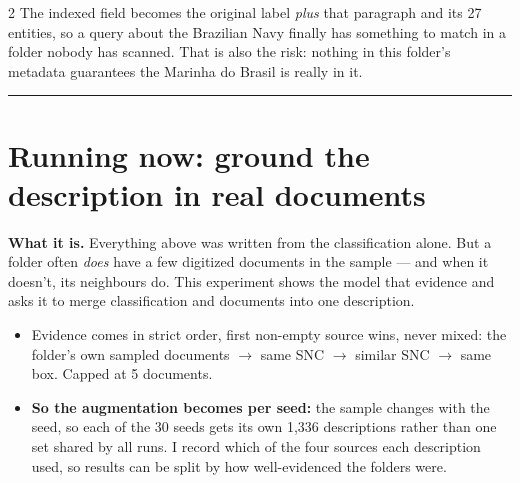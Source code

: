 \documentclass[a4paper,11pt]{article}
\newcommand{\partrule}{\vspace{2pt}\hrule\vspace{6pt}}
\begin{document}
\begin{multicols}{2}
The indexed field becomes the original label \emph{plus} that paragraph and its 27 entities, so
a query about the Brazilian Navy
finally has something to match in a folder nobody has scanned. That is also the risk: nothing
in this folder's metadata guarantees the Marinha do Brasil is really in it.

\partrule

\section{Running now: ground the description in real documents}

\textbf{What it is.} Everything above was written from the classification alone. But a folder
often \emph{does} have a few digitized documents in the sample --- and when it doesn't, its
neighbours do. This experiment shows the model that evidence and asks it to merge
classification and documents into one description.

\begin{itemize}
\item Evidence comes in strict order, first non-empty source wins, never mixed: the folder's
      own sampled documents $\rightarrow$ same SNC $\rightarrow$ similar SNC $\rightarrow$ same
      box. Capped at 5 documents.
\item \textbf{So the augmentation becomes per seed:} the sample changes with the seed, so each
      of the 30 seeds gets its own 1{,}336 descriptions rather than one set shared by all runs.
      I record which of the four sources each description used, so results can be split by how
      well-evidenced the folders were.
\end{itemize}



\end{multicols}
\end{document}
